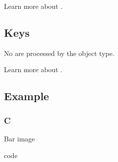 \documentclass[letterpaper,10pt,english]{sphinxmanual}
\begin{document}
Learn more about {\hyperref[\detokenize{overview/events::doc}]{}}.


\subsection{Keys}
\label{\detokenize{object-types/bar:keys}}
No  are processed by the object type.

Learn more about {\hyperref[\detokenize{overview/indev::doc}]{}}.


\subsection{Example}
\label{\detokenize{object-types/bar:example}}

\subsubsection{C}
\label{\detokenize{object-types/bar:c}}
Bar image

code
\end{document}
